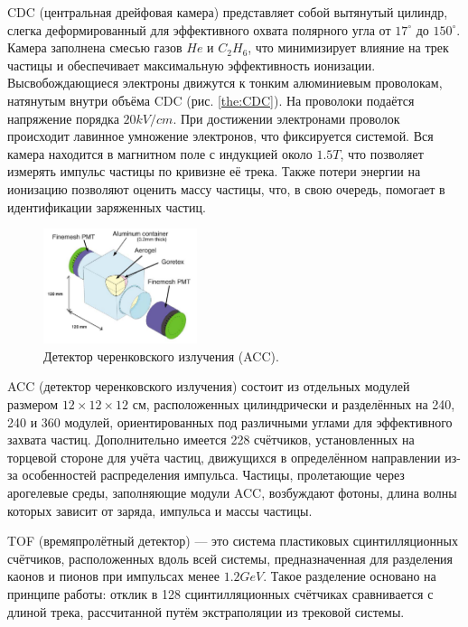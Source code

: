 CDC (центральная дрейфовая камера) представляет собой вытянутый цилиндр, слегка деформированный для 
эффективного охвата полярного угла от $17^\circ$ до $150^\circ$. Камера заполнена смесью газов $He$ и $C_2H_6$, 
что минимизирует влияние на трек частицы и обеспечивает максимальную эффективность ионизации. 
Высвобождающиеся электроны движутся к тонким алюминиевым проволокам, натянутым внутри объёма CDC (рис. \ref{the:CDC}). 
На проволоки подаётся напряжение порядка $20kV/cm$. При достижении электронами проволок происходит лавинное умножение электронов, 
что фиксируется системой. Вся камера находится в магнитном поле с индукцией около $1.5 T$, что позволяет измерять импульс 
частицы по кривизне её трека. Также потери энергии на ионизацию позволяют оценить массу частицы, что, в свою очередь, 
помогает в идентификации заряженных частиц.

\begin{figure}
    \centering
    \includegraphics[width=0.4\textwidth]{img/ACC.png}
    \caption{Детектор черенковского излучения (ACC).}
    \label{the:ACC}
\end{figure}

ACC (детектор черенковского излучения) состоит из отдельных модулей размером $12\times12\times12$ см, 
расположенных цилиндрически и разделённых на 240, 240 и 360 модулей, ориентированных под различными углами для эффективного 
захвата частиц. Дополнительно имеется 228 счётчиков, установленных на торцевой стороне для учёта частиц, движущихся в 
определённом направлении из-за особенностей распределения импульса. Частицы, пролетающие через арогелевые среды, заполняющие 
модули ACC, возбуждают фотоны, длина волны которых зависит от заряда, импульса и массы частицы.

TOF (времяпролётный детектор) --- это система пластиковых сцинтилляционных счётчиков, 
расположенных вдоль всей системы, предназначенная для разделения каонов и пионов при импульсах менее $1.2 GeV$. 
Такое разделение основано на принципе работы: отклик в 128 сцинтилляционных счётчиках сравнивается с 
длиной трека, рассчитанной путём экстраполяции из трековой системы.


